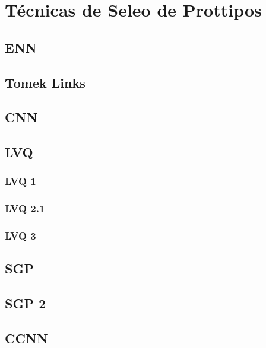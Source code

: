 
\chapter{Técnicas de Seleo de Prottipos}

\section{ENN}
\section{Tomek Links}
\section{CNN}
\section{LVQ}
\subsection{LVQ 1}
\subsection{LVQ 2.1}
\subsection{LVQ 3}
\section{SGP}
\section{SGP 2}
\section{CCNN}


